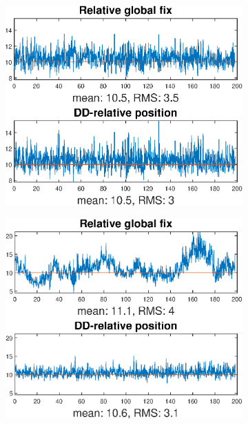 \begin{figure}[!htb]
\begin{subfigure}{\textwidth}
\includegraphics[width=\textwidth]{Results/MSEplots/Esim1.eps}
\end{subfigure}
\begin{subfigure}{\textwidth}
\includegraphics[width=\textwidth]{Results/MSEplots/Esim10.eps}
\end{subfigure}
\end{figure}
